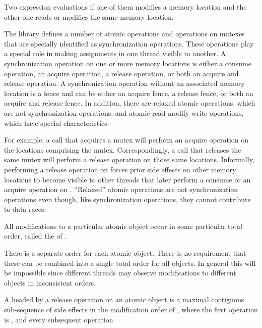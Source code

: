 \pnum
Two expression evaluations  if one of them modifies a memory
location and the other one reads or modifies the same
memory location.

\pnum
The library defines a number of atomic operations and
operations on mutexes that are specially identified as
synchronization operations. These operations play a special role in making
assignments in one thread visible to another. A synchronization operation on one
or more memory locations is either a consume operation, an acquire operation, a
release operation, or both an acquire and release operation. A synchronization
operation without an associated memory location is a fence and can be either an
acquire fence, a release fence, or both an acquire and release fence. In
addition, there are relaxed atomic operations, which are not synchronization
operations, and atomic read-modify-write operations, which have special
characteristics. \begin{note} For example, a call that acquires a mutex will
perform an acquire operation on the locations comprising the mutex.
Correspondingly, a call that releases the same mutex will perform a release
operation on those same locations. Informally, performing a release operation on
 forces prior
%
side effects on other memory locations to become visible
to other threads that later perform a consume or an acquire operation on
. ``Relaxed'' atomic operations are not synchronization operations even
though, like synchronization operations, they cannot contribute to data races.
\end{note}

\pnum
All modifications to a particular atomic object  occur in some
particular total order, called the  of .
\begin{note} There is a separate order for each
atomic object. There is no requirement that these can be combined into a single
total order for all objects. In general this will be impossible since different
threads may observe modifications to different objects in inconsistent orders.
\end{note}

\pnum
A  headed by a release operation  on an atomic object
 is a maximal contiguous sub-sequence of
%
side effects in the
modification order of , where the first operation is , and
every subsequent operation

